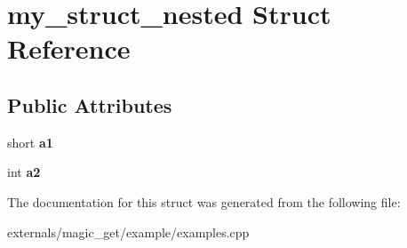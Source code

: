 \hypertarget{structmy__struct__nested}{}\section{my\+\_\+struct\+\_\+nested Struct Reference}
\label{structmy__struct__nested}
\subsection*{Public Attributes}
\begin{DoxyCompactItemize}
\item 
\mbox{\label{structmy__struct__nested_a264cd592055f777eeabf1cdf6b6e1903}} 
short {\bfseries a1}
\item 
\mbox{\label{structmy__struct__nested_ad57730d0c096a9d2a65f0fb4c86787ab}} 
int {\bfseries a2}
\end{DoxyCompactItemize}


The documentation for this struct was generated from the following file\+:\begin{DoxyCompactItemize}
\item 
externals/magic\+\_\+get/example/examples.\+cpp\end{DoxyCompactItemize}
